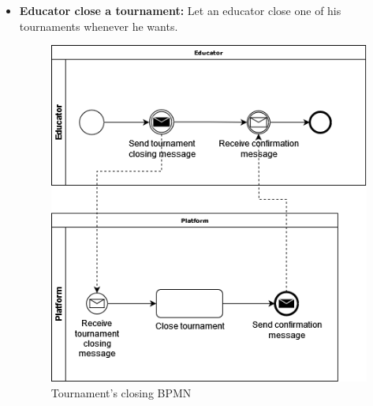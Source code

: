 \documentclass{article}
\begin{document}
{\begin{itemize}
            \item \textbf{Educator close a tournament:} Let an educator close one of his tournaments whenever he wants.
            \begin{figure}[H]
                \centering
                \includegraphics[scale=0.4]{images/BPMN/BPMN9.png}
                \caption{Tournament's closing BPMN}
                \label{fig:TournamentClosingBPMN}
            \end{figure}


\end{itemize}}
\end{document}
